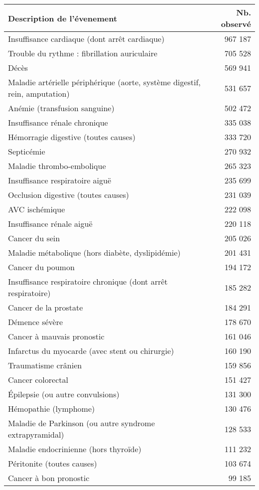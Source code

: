 \begin{tabular}{p{}r}
\toprule
Description de l'évenement & Nb. observé \\ 
\midrule
Insuffisance cardiaque (dont arrêt cardiaque) & 967 187 \\ 
Trouble du rythme : fibrillation auriculaire & 705 528 \\ 
Décès & 569 941 \\ 
Maladie artérielle périphérique (aorte, système digestif, rein, amputation) & 531 657 \\ 
Anémie (transfusion sanguine) & 502 472 \\ 
Insuffisance rénale chronique & 335 038 \\ 
Hémorragie digestive (toutes causes) & 333 720 \\ 
Septicémie & 270 932 \\ 
Maladie thrombo-embolique & 265 323 \\ 
Insuffisance respiratoire aiguë & 235 699 \\ 
Occlusion digestive (toutes causes) & 231 039 \\ 
AVC ischémique & 222 098 \\ 
Insuffisance rénale aiguë & 220 118 \\ 
Cancer du sein & 205 026 \\ 
Maladie métabolique (hors diabète, dyslipidémie) & 201 431 \\ 
Cancer du poumon & 194 172 \\ 
Insuffisance respiratoire chronique (dont arrêt respiratoire) & 185 282 \\ 
Cancer de la prostate & 184 291 \\ 
Démence sévère & 178 670 \\ 
Cancer à mauvais pronostic & 161 046 \\ 
Infarctus du myocarde (avec stent ou chirurgie) & 160 190 \\ 
Traumatisme crânien & 159 856 \\ 
Cancer colorectal & 151 427 \\ 
Épilepsie (ou autre convulsions) & 131 300 \\ 
Hémopathie (lymphome) & 130 476 \\ 
Maladie de Parkinson (ou autre syndrome extrapyramidal) & 128 533 \\ 
Maladie endocrinienne (hors thyroïde) & 111 232 \\ 
Péritonite (toutes causes) & 103 674 \\ 
Cancer à bon pronostic & 99 185 \\ 

\end{tabular}
